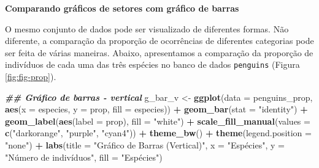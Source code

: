 \documentclass[
]{article}
\newenvironment{Shaded}{\begin{snugshade}}{\end{snugshade}}
\newcommand{\AttributeTok}[1]{\textcolor[rgb]{0.13,0.29,0.53}{#1}}
\newcommand{\DocumentationTok}[1]{\textcolor[rgb]{0.56,0.35,0.01}{\textbf{\textit{#1}}}}
\newcommand{\FunctionTok}[1]{\textcolor[rgb]{0.13,0.29,0.53}{\textbf{#1}}}
\newcommand{\NormalTok}[1]{#1}
\newcommand{\OtherTok}[1]{\textcolor[rgb]{0.56,0.35,0.01}{#1}}
\newcommand{\SpecialCharTok}[1]{\textcolor[rgb]{0.81,0.36,0.00}{\textbf{#1}}}
\newcommand{\StringTok}[1]{\textcolor[rgb]{0.31,0.60,0.02}{#1}}
\begin{document}
\textbf{Comparando gráficos de setores com gráfico de barras}

O mesmo conjunto de dados pode ser visualizado de diferentes formas. Não diferente, a comparação da proporção de ocorrências de diferentes categorias pode ser feita de várias maneiras. Abaixo, apresentamos a comparação da proporção de indivíduos de cada uma das três espécies no banco de dados \texttt{penguins} (Figura \ref{fig:fig-prop}).

\begin{Shaded}
\begin{Highlighting}[]
\DocumentationTok{\#\# Gráfico de barras {-} vertical  }
\NormalTok{g\_bar\_v }\OtherTok{\textless{}{-}} \FunctionTok{ggplot}\NormalTok{(}\AttributeTok{data =}\NormalTok{ penguins\_prop, }\FunctionTok{aes}\NormalTok{(}\AttributeTok{x =}\NormalTok{ especies, }\AttributeTok{y =}\NormalTok{ prop, }\AttributeTok{fill =}\NormalTok{ especies)) }\SpecialCharTok{+}
    \FunctionTok{geom\_bar}\NormalTok{(}\AttributeTok{stat =} \StringTok{"identity"}\NormalTok{) }\SpecialCharTok{+}
    \FunctionTok{geom\_label}\NormalTok{(}\FunctionTok{aes}\NormalTok{(}\AttributeTok{label =}\NormalTok{ prop), }\AttributeTok{fill =} \StringTok{"white"}\NormalTok{) }\SpecialCharTok{+}
    \FunctionTok{scale\_fill\_manual}\NormalTok{(}\AttributeTok{values =} \FunctionTok{c}\NormalTok{(}\StringTok{"darkorange"}\NormalTok{, }\StringTok{"purple"}\NormalTok{, }\StringTok{"cyan4"}\NormalTok{)) }\SpecialCharTok{+}
    \FunctionTok{theme\_bw}\NormalTok{() }\SpecialCharTok{+}
    \FunctionTok{theme}\NormalTok{(}\AttributeTok{legend.position =} \StringTok{"none"}\NormalTok{) }\SpecialCharTok{+}
    \FunctionTok{labs}\NormalTok{(}\AttributeTok{title =} \StringTok{"Gráfico de Barras (Vertical)"}\NormalTok{, }\AttributeTok{x =} \StringTok{"Espécies"}\NormalTok{, }
         \AttributeTok{y =} \StringTok{"Número de indivíduos"}\NormalTok{, }\AttributeTok{fill =} \StringTok{"Espécies"}\NormalTok{)}


\end{Highlighting}
\end{Shaded}
\end{document}
